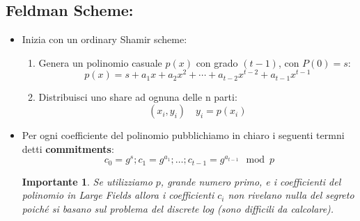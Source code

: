 \documentclass{book}
\newtheorem*{Importante}{\textbf{Importante}}
\begin{document}
\subsection{Feldman Scheme:\@dealer}
\begin{itemize}
    \item Inizia con un ordinary Shamir scheme:\begin{enumerate}
              \item Genera un polinomio casuale \(p(x)\) con grado \((t-1)\), con \(P(0)=s\):
                    \begin{equation*}
                        p(x)=s+a_{1}x+a_{2}x^{2}+\cdots+a_{t-2}x^{t-2}+a_{t-1}x^{t-1}
                    \end{equation*}
              \item Distribuisci uno share ad ognuna delle n parti:\begin{equation*}
                        (x_{i},y_{i})\quad y_{i}=p(x_{i})
                    \end{equation*}
          \end{enumerate}
    \item Per ogni coefficiente del polinomio pubblichiamo in chiaro i seguenti termni detti \textbf{commitments}:\begin{equation*}
              c_{0}=g^{s};c_{1}=g^{a_{1}};\ldots;c_{t-1}=g^{a_{t-1}}\mod{p}
          \end{equation*}
          \begin{Importante}
              Se utilizziamo \(p\), grande numero primo, e i coefficienti del polinomio in \emph{Large Fields} allora i coefficienti \(c_{i}\) non rivelano nulla del segreto poiché si basano sul problema del discrete log (sono difficili da calcolare).
          \end{Importante}
\end{itemize}
\end{document}
